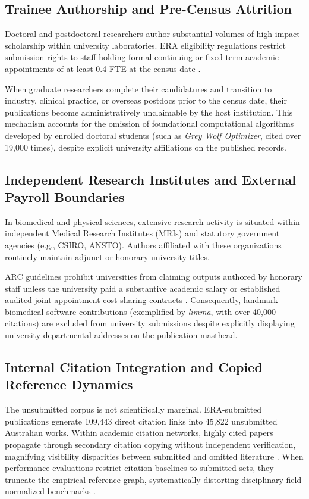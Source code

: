 \subsection{Trainee Authorship and Pre-Census Attrition}
Doctoral and postdoctoral researchers author substantial volumes of high-impact scholarship within university laboratories. ERA eligibility regulations restrict submission rights to staff holding formal continuing or fixed-term academic appointments of at least 0.4 FTE at the census date \cite{mowBlackBoxResearch2010}. 

When graduate researchers complete their candidatures and transition to industry, clinical practice, or overseas postdocs prior to the census date, their publications become administratively unclaimable by the host institution. This mechanism accounts for the omission of foundational computational algorithms developed by enrolled doctoral students (such as \textit{Grey Wolf Optimizer}, cited over 19,000 times), despite explicit university affiliations on the published records.

\subsection{Independent Research Institutes and External Payroll Boundaries}
In biomedical and physical sciences, extensive research activity is situated within independent Medical Research Institutes (MRIs) and statutory government agencies (e.g., CSIRO, ANSTO). Authors affiliated with these organizations routinely maintain adjunct or honorary university titles. 

ARC guidelines prohibit universities from claiming outputs authored by honorary staff unless the university paid a substantive academic salary or established audited joint-appointment cost-sharing contracts \cite{mowBlackBoxResearch2010}. Consequently, landmark biomedical software contributions (exemplified by \textit{limma}, with over 40,000 citations) are excluded from university submissions despite explicitly displaying university departmental addresses on the publication masthead.

\subsection{Internal Citation Integration and Copied Reference Dynamics}
The unsubmitted corpus is not scientifically marginal. ERA-submitted publications generate 109,443 direct citation links into 45,822 unsubmitted Australian works. Within academic citation networks, highly cited papers propagate through secondary citation copying without independent verification, magnifying visibility disparities between submitted and omitted literature \cite{simkinCopiedCitationsCreate2003,simkinReadYouCite2002}. When performance evaluations restrict citation baselines to submitted sets, they truncate the empirical reference graph, systematically distorting disciplinary field-normalized benchmarks \cite{hicksBibliometricsLeidenManifesto2015,mitchellAffiliationErrorsDistorted2026}.
